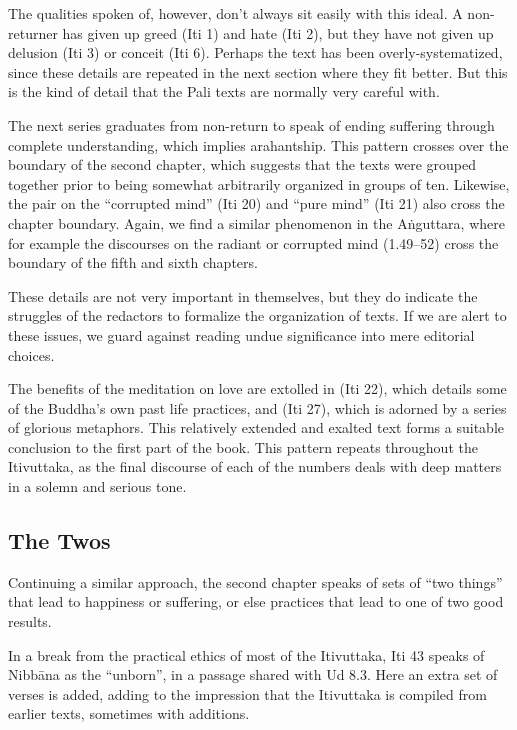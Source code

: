 \documentclass[12pt,openany]{book}%
\begin{document}
The qualities spoken of, however, don’t always sit easily with this ideal. A non-returner has given up greed (Iti 1) and hate (Iti 2), but they have not given up delusion (Iti 3) or conceit (Iti 6). Perhaps the text has been overly-systematized, since these details are repeated in the next section where they fit better. But this is the kind of detail that the Pali texts are normally very careful with.

The next series graduates from non-return to speak of ending suffering through complete understanding, which implies arahantship. This pattern crosses over the boundary of the second chapter, which suggests that the texts were grouped together prior to being somewhat arbitrarily organized in groups of ten. Likewise, the pair on the “corrupted mind” (Iti 20) and “pure mind” (Iti 21) also cross the chapter boundary. Again, we find a similar phenomenon in the \textsanskrit{Aṅguttara}, where for example the discourses on the radiant or corrupted mind (1.49–52) cross the boundary of the fifth and sixth chapters.

These details are not very important in themselves, but they do indicate the struggles of the redactors to formalize the organization of texts. If we are alert to these issues, we guard against reading undue significance into mere editorial choices.

The benefits of the meditation on love are extolled in (Iti 22), which details some of the Buddha’s own past life practices, and (Iti 27), which is adorned by a series of glorious metaphors. This relatively extended and exalted text forms a suitable conclusion to the first part of the book. This pattern repeats throughout the Itivuttaka, as the final discourse of each of the numbers deals with deep matters in a solemn and serious tone.

\subsection*{The Twos}

Continuing a similar approach, the second chapter speaks of sets of “two things” that lead to happiness or suffering, or else practices that lead to one of two good results.

In a break from the practical ethics of most of the Itivuttaka, Iti 43 speaks of \textsanskrit{Nibbāna} as the “unborn”, in a passage shared with Ud 8.3. Here an extra set of verses is added, adding to the impression that the Itivuttaka is compiled from earlier texts, sometimes with additions.
\end{document}
